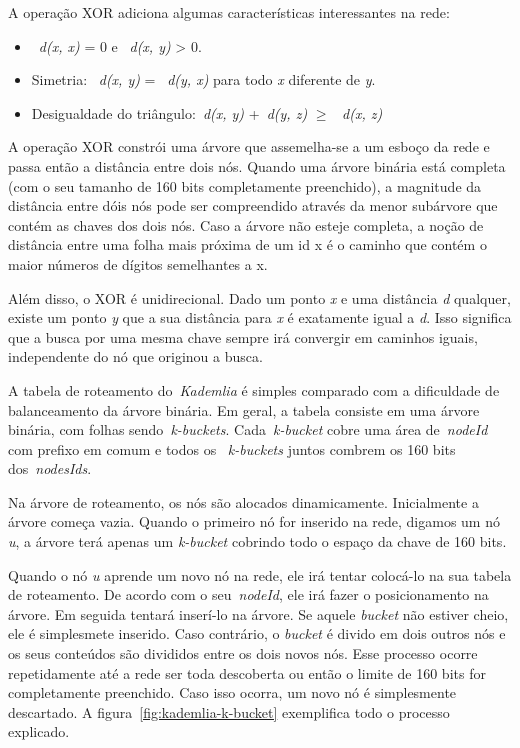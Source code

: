 A operação XOR adiciona algumas características interessantes na rede:
\begin{itemize}
	\item ~\emph{d(x, x)} = 0 e ~\emph{d(x, y)} > 0.
	\item Simetria: ~\emph{d(x, y)} = ~\emph{d(y, x)} para todo \emph{x} diferente de \emph{y}.
	\item Desigualdade do triângulo:~\emph{d(x, y)} +~\emph{d(y, z)} $\ge$ ~\emph{d(x, z)}
\end{itemize}

A operação XOR constrói uma árvore que assemelha-se a um esboço da rede e passa então a distância entre dois nós. Quando uma árvore binária está completa (com o seu tamanho de 160 bits completamente preenchido), a magnitude da distância entre dóis nós pode ser compreendido através da menor subárvore que contém as chaves dos dois nós. Caso a árvore não esteje completa, a noção de distância entre uma folha mais próxima de um id x é o caminho que contém o maior números de dígitos semelhantes a x.

Além disso, o XOR é unidirecional. Dado um ponto \emph{x} e uma distância \emph{d} qualquer, existe um ponto \emph{y} que a sua distância para \emph{x} é exatamente igual a \emph{d}. Isso significa que a busca por uma mesma chave sempre irá convergir em caminhos iguais, independente do nó que originou a busca.

A tabela de roteamento do~\emph{Kademlia} é simples comparado com a dificuldade de balanceamento da árvore binária. Em geral, a tabela consiste em uma árvore binária, com folhas sendo~\emph{k-buckets}. Cada~\emph{k-bucket} cobre uma área de~\emph{nodeId} com prefixo em comum e todos os ~\emph{k-buckets} juntos combrem os 160 bits dos~\emph{nodesIds}.

Na árvore de roteamento, os nós são alocados dinamicamente. Inicialmente a árvore começa vazia. Quando o primeiro nó for inserido na rede, digamos um nó \emph{u}, a árvore terá apenas um \emph{k-bucket} cobrindo todo o espaço da chave de 160 bits.

Quando o nó \emph{u} aprende um novo nó na rede, ele irá tentar colocá-lo na sua tabela de roteamento. De acordo com o seu~\emph{nodeId}, ele irá fazer o posicionamento na árvore. Em seguida tentará inserí-lo na árvore. Se aquele \emph{bucket} não estiver cheio, ele é simplesmete inserido. Caso contrário, o \emph{bucket} é divido em dois outros nós e os seus conteúdos são divididos entre os dois novos nós. Esse processo ocorre repetidamente até a rede ser toda descoberta ou então o limite de 160 bits for completamente preenchido. Caso isso ocorra, um novo nó é simplesmente descartado. A figura~\ref{fig:kademlia-k-bucket} exemplifica todo o processo explicado.

